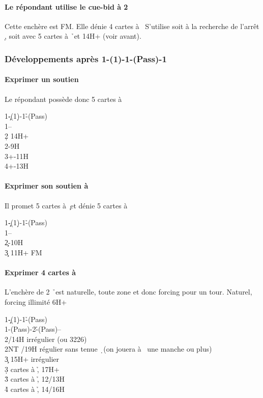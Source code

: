\documentclass[a4paper]{article}
\begin{document}
\paragraph{Le répondant utilise le cue-bid à 2 \pdfd}

Cette enchère est FM. Elle dénie 4 cartes à \s\ 
S’utilise soit à la recherche de l’arrêt \d , soit avec 5 cartes à \h\ et 14H+ (voir avant).

\subsubsection{Développements après 1\pdfc-(1\pdfd)-1\pdfh-(Pass)-1\pdfs}

\paragraph{Exprimer un soutien \pdfs}

Le répondant possède donc 5 cartes à \s 

\begin{bidtable}
1\c-(1\d)-1\h-(Pass)\\
1\s--\\
2\d \> 14H+\\
2\s {}-9H\\
3\s {}+-11H\\
4\s {}+-13H
\end{bidtable}

\paragraph{Exprimer son soutien à \pdfc}

Il promet 5 cartes à \c\ et dénie 5 cartes à \s 

\begin{bidtable}
1\c-(1\d)-1\h-(Pass)\\
1\s--\\
2\c {}-10H\\
3\c \> 11H+ FM
\end{bidtable}

\paragraph{Exprimer 4 cartes à \pdfh}

L’enchère de 2 \h\ est naturelle, toute zone et donc forcing pour un tour.
Naturel, forcing illimité 6H+

\begin{bidtable}
1\c-(1\d)-1\h-(Pass)\\
1\s-(Pass)-2\h-(Pass)--\\
2\s {}/14H irrégulier (ou 3226)\\
2NT /19H régulier sans tenue \d\ (on jouera à \s\ une manche ou plus)\\
3\c \> 15H+ irrégulier\\
3\d {} cartes à \h , 17H+\\
3\h {} cartes à \h , 12/13H\\
4\h \> 4 cartes à \h , 14/16H
\end{bidtable}
\end{document}
